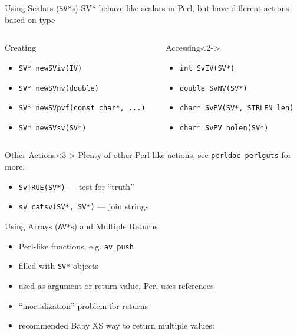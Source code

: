 \documentclass{beamer}
\providecommand{\code}[1]{{\texttt{\scriptsize{#1}}}}
\begin{document}
\begin{frame}{Using Scalars (\texttt{SV*}s)}
  SV* behave like scalars in Perl, but have different actions based on type
  \begin{columns}
    \begin{column}{0.49\linewidth}
      \begin{block}{Creating}
        \begin{itemize}
          \item \code{SV* newSViv(IV)}
          \item \code{SV* newSVnv(double)}
          \item \code{SV* newSVpvf(const char*, ...)}
          \item \code{SV* newSVsv(SV*)}
        \end{itemize}
      \end{block}
    \end{column}
    \begin{column}{0.49\linewidth}
      \begin{block}{Accessing}<2->
        \begin{itemize}
          \item \code{int SvIV(SV*)}
          \item \code{double SvNV(SV*)}
          \item \code{char* SvPV(SV*, STRLEN len)}
          \item \code{char* SvPV\_nolen(SV*)}
        \end{itemize}
      \end{block}
    \end{column}
  \end{columns}
  \begin{block}{Other Actions}<3->
    Plenty of other Perl-like actions, see \code{perldoc perlguts} for more.
    \begin{itemize}
      \item \code{SvTRUE(SV*)} --- test for ``truth''
      \item \code{sv\_catsv(SV*, SV*)} --- join strings
    \end{itemize}
  \end{block}
\end{frame}

\begin{frame}{Using Arrays (\texttt{AV*}s) and Multiple Returns}
  \begin{itemize}
    \item Perl-like functions, e.g. \code{av\_push}
    \item<2-> filled with \code{SV*} objects
    \item<3-> used as argument or return value, Perl uses references
    \item<4-> ``mortalization'' problem for returns
    \item<5-> recommended Baby XS way to return multiple values:
  \end{itemize}
  \vfill
  \begin{block}{}
    \scriptsize
    
  \end{block}
\end{frame}
\end{document}
